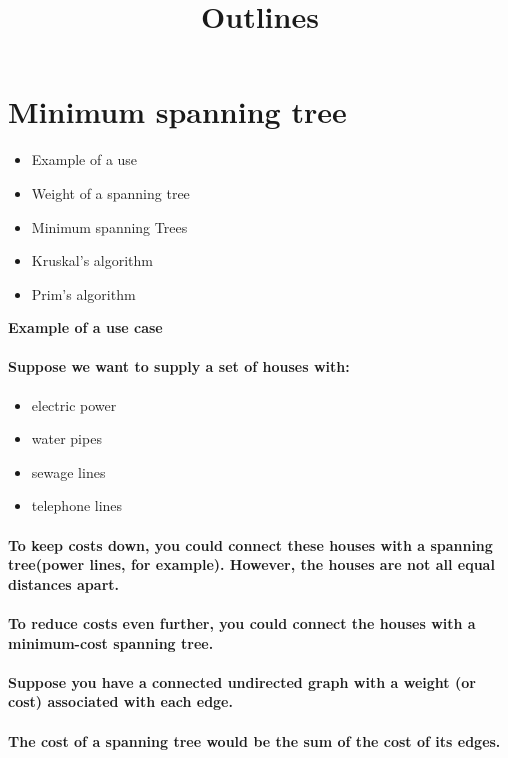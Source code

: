 \documentclass{article}
\begin{document}
\section{Minimum spanning tree}

\title{Outlines}

\begin{itemize}
  \item Example of a use
  \item Weight of a spanning tree
  \item Minimum spanning Trees
  \item Kruskal's algorithm
  \item Prim's algorithm
\end{itemize}

\textbf{Example of a use case}

\paragraph{Suppose we want to supply a set of houses with:}

\begin{itemize}
  \item electric power
  \item water pipes
  \item sewage lines
  \item telephone lines
\end{itemize}

\paragraph{To keep costs down, you could connect these houses with a spanning tree(power lines, for example). However, the houses are not all equal distances apart.}

\paragraph{To reduce costs even further, you could connect the houses with a minimum-cost spanning tree.}

\paragraph{Suppose you have a connected undirected graph with a weight (or cost) associated with each edge.}

\paragraph{The cost of a spanning tree would be the sum of the cost of its edges.}
\end{document}
